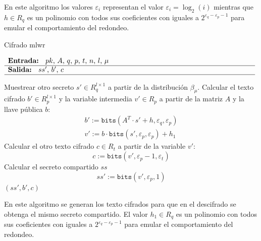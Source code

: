 En este algoritmo los valores $\varepsilon_i$ representan el valor \(\varepsilon_i=\log_2 (i)\) mientras que \(h\in  R_q\) es un polinomio con todos sus coeficientes con iguales a \(2^{\varepsilon_q-\varepsilon_p-1}\) para emular el comportamiento del redondeo.

\begin{algorithm}[H]
	\caption{Cifrado \acrshort{mlwr}} 
	$\begin{array}{p{\textwidth}}
		\textbf{Entrada: } \(pk\), \(A\), \(q\), \(p\), \(t\), \(n\), \(l\), \(\mu\)\\ 
		\hline
		\textbf{Salida: } \(ss'\), \(b'\), \(c\) \\ 
		\hline
	\end{array}$
	\begin{algorithmic}[1]
		\State Muestrear otro secreto \(s'\in R_q^{l\times 1}\) a partir de la distribución \(\beta_\mu\).	
		\State	Calcular el texto cifrado \(b' \in R_p^{l\times 1}\) y la variable intermedia \(v'\in R_p\) a partir de la matriz \(A\) y la llave pública \(b\):
		\begin{equation}
			\begin{array}{l}
				b':=\texttt{bits}(A^T\cdot s'+h,\varepsilon_q,\varepsilon_p) \\
				v':=b \cdot \texttt{bits}(s',\varepsilon_p,\varepsilon_p)+ h_1 
			\end{array}
		\end{equation}
		\State Calcular el otro texto cifrado \(c\in R_t\) a partir de la variable \(v'\):
		\begin{equation}
			c:=\texttt{bits}(v',\varepsilon_p -1,\varepsilon_t)
		\end{equation}
		\State Calcular el secreto compartido \(ss\)
		\begin{equation}
			ss':=\texttt{bits}(v',\varepsilon_p,1)
		\end{equation}
		\State \Return \((ss', b', c)\)
	\end{algorithmic}
\end{algorithm}

En este algoritmo se generan los texto cifrados para que en el descifrado se obtenga el mismo secreto compartido. El valor \(h_1\in  R_q\) es un polinomio con todos sus coeficientes con iguales a \(2^{\varepsilon_q-\varepsilon_p-1}\) para emular el comportamiento del redondeo.

